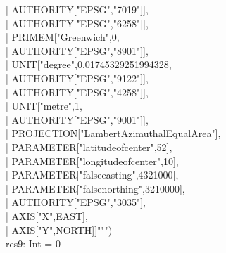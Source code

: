 \documentclass {article}
\begin{document}
     |     \hspace*{10mm} AUTHORITY["EPSG","7019"]],\\
     |     \hspace*{8mm} AUTHORITY["EPSG","6258"]],\\
     |     \hspace*{6mm} PRIMEM["Greenwich",0,\\
     |     \hspace*{8mm} AUTHORITY["EPSG","8901"]],\\
     |     \hspace*{6mm} UNIT["degree",0.01745329251994328,\\
     |     \hspace*{8mm} AUTHORITY["EPSG","9122"]],\\
     |     \hspace*{6mm} AUTHORITY["EPSG","4258"]],\\
     |     \hspace*{4mm} UNIT["metre",1,\\
     |     \hspace*{6mm} AUTHORITY["EPSG","9001"]],\\
     |     \hspace*{4mm} PROJECTION["Lambert\underline{\space}Azimuthal\underline{\space}Equal\underline{\space}Area"],\\
     |     \hspace*{4mm} PARAMETER["latitude\underline{\space}of\underline{\space}center",52],\\
     |     \hspace*{4mm} PARAMETER["longitude\underline{\space}of\underline{\space}center",10],\\
     |     \hspace*{4mm} PARAMETER["false\underline{\space}easting",4321000],\\
     |     \hspace*{4mm} PARAMETER["false\underline{\space}northing",3210000],\\
     |     \hspace*{4mm} AUTHORITY["EPSG","3035"],\\
     |     \hspace*{4mm} AXIS["X",EAST],\\
     |     \hspace*{4mm} AXIS["Y",NORTH]]""")\\
res9: Int = 0\\
\\
\\
\end{document}
